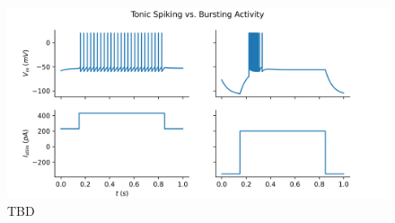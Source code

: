 \documentclass[11pt]{article}
\begin{document}
\begin{figure}
    \includegraphics[scale=0.75]{IFB_tonic_bursting}
    \centering
    \caption{TBD}
    \label{fig:burst}
\end{figure}
\end{document}
